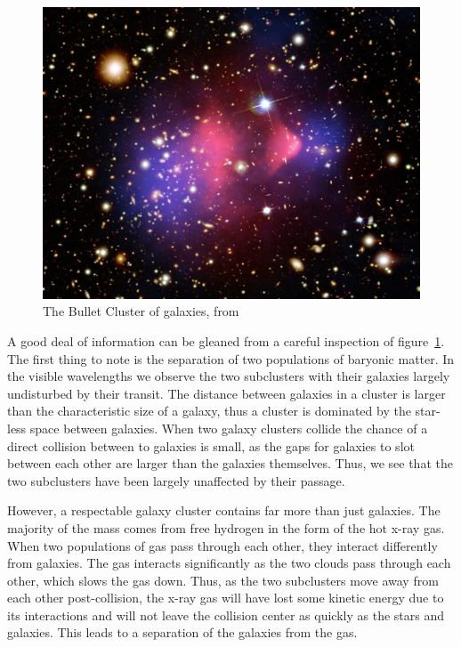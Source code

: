 \begin{figure}[h]
	\includegraphics{figures/chapter_one/bullet_cluster.png}
	\caption{The Bullet Cluster of galaxies, from~\cite{bullet}}
	\label{fig:bullet_cluster}
\end{figure}

A good deal of information can be gleaned from a careful inspection of figure~\ref{fig:bullet_cluster}. The first thing to note is the separation of two populations of baryonic matter. In the visible wavelengths we observe the two subclusters with their galaxies largely undisturbed by their transit. The distance between galaxies in a cluster is larger than the characteristic size of a galaxy, thus a cluster is dominated by the star-less space between galaxies. When two galaxy clusters collide the chance of a direct collision between to galaxies is small, as the gaps for galaxies to slot between each other are larger than the galaxies themselves. Thus, we see that the two subclusters have been largely unaffected by their passage.

However, a respectable galaxy cluster contains far more than just galaxies. The majority of the mass comes from free hydrogen in the form of the hot x-ray gas. When two populations of gas pass through each other, they interact differently from galaxies. The gas interacts significantly as the two clouds pass through each other, which slows the gas down. Thus, as the two subclusters move away from each other post-collision, the x-ray gas will have lost some kinetic energy due to its interactions and will not leave the collision center as quickly as the stars and galaxies. This leads to a separation of the galaxies from the gas.


